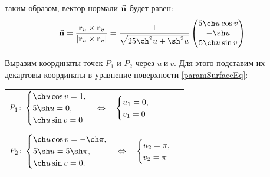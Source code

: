 \documentclass[12pt,a4paper]{article}
\newcommand{\boldVec}[1]{\mathbf #1}
\begin{document}
    \noindent таким образом, вектор нормали $ \vec{\textbf n} $ будет равен: 
    \begin{equation}
        \label{normVec}
        \vec{\textbf n} = \frac{\boldVec r_u \times \boldVec r_v}{| \boldVec r_u \times \boldVec r_v |} = \frac{1}{\sqrt{25 \ch^2 u + \sh^2 u}}
        \begin{pmatrix}
            5 \ch u \cos v
            \\
            -\sh u
            \\
            5 \ch u \sin v
        \end{pmatrix} \! .
    \end{equation}

    Выразим координаты точек $ P_1 $ и $ P_2 $ через $ u \ \text{и} \ v $. Для этого подставим их декартовы координаты в уравнение поверхности \eqref{paramSurfaceEq}:
    \begin{table}[h]
        \centering
        \begin{tabular}{l}
            $
                P_1 \colon
                    \begin{cases}
                        \ch u \cos v = 1,
                        \\
                        5 \sh u = 0,
                        \\
                        \ch u \sin v = 0
                    \end{cases}
                \Leftrightarrow \quad
                    \begin{cases}
                        u_1 = 0,
                        \\
                        v_1 = 0
                    \end{cases}
            $
            \\ \\
            $
                P_2 \colon
                    \begin{cases}
                        \ch u \cos v = -\ch \pi,
                        \\
                        5 \sh u =  5 \sh \pi,
                        \\
                        \ch u \sin v = 0.
                    \end{cases}
                \Leftrightarrow \quad
                    \begin{cases}
                        u_2 = \pi,
                        \\
                        v_2 = \pi
                    \end{cases}
            $
        \end{tabular}
    \end{table}
\end{document}
